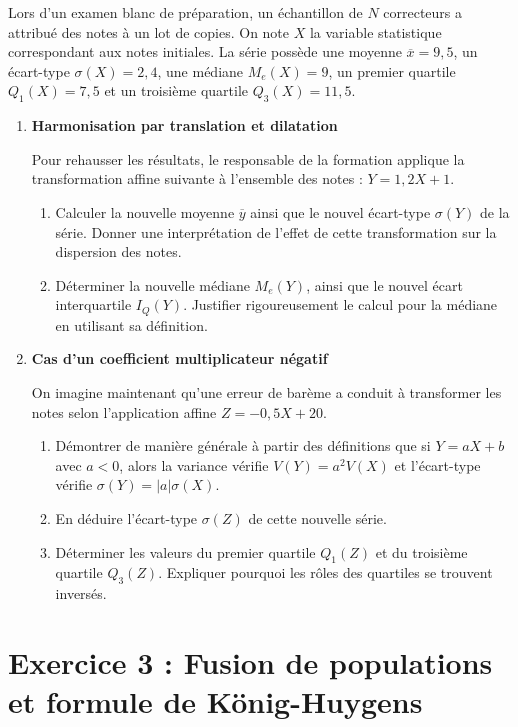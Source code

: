 \documentclass[11pt,a4paper]{article}
\begin{document}
Lors d'un examen blanc de préparation, un échantillon de $N$ correcteurs a attribué des notes à un lot de copies. On note $X$ la variable statistique correspondant aux notes initiales. La série possède une moyenne $\overline{x} = 9,5$, un écart-type $\sigma(X) = 2,4$, une médiane $M_e(X) = 9$, un premier quartile $Q_1(X) = 7,5$ et un troisième quartile $Q_3(X) = 11,5$.

\begin{enumerate}
    \item \textbf{Harmonisation par translation et dilatation}
    
    Pour rehausser les résultats, le responsable de la formation applique la transformation affine suivante à l'ensemble des notes : $Y = 1,2X + 1$.
    \begin{enumerate}
        \item Calculer la nouvelle moyenne $\overline{y}$ ainsi que le nouvel écart-type $\sigma(Y)$ de la série. Donner une interprétation de l'effet de cette transformation sur la dispersion des notes.
        \item Déterminer la nouvelle médiane $M_e(Y)$, ainsi que le nouvel écart interquartile $I_Q(Y)$. Justifier rigoureusement le calcul pour la médiane en utilisant sa définition.
    \end{enumerate}

    \item \textbf{Cas d'un coefficient multiplicateur négatif}
    
    On imagine maintenant qu'une erreur de barème a conduit à transformer les notes selon l'application affine $Z = -0,5X + 20$.
    \begin{enumerate}
        \item Démontrer de manière générale à partir des définitions que si $Y = aX + b$ avec $a < 0$, alors la variance vérifie $V(Y) = a^2 V(X)$ et l'écart-type vérifie $\sigma(Y) = |a|\sigma(X)$.
        \item En déduire l'écart-type $\sigma(Z)$ de cette nouvelle série.
        \item Déterminer les valeurs du premier quartile $Q_1(Z)$ et du troisième quartile $Q_3(Z)$. Expliquer pourquoi les rôles des quartiles se trouvent inversés.
    \end{enumerate}
\end{enumerate}

\vspace{0.5cm}

\section*{Exercice 3 : Fusion de populations et formule de König-Huygens}
\end{document}
